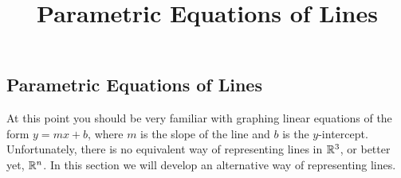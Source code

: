 \documentclass{ximera}
\title{Parametric Equations of Lines} \license{CC BY-NC-SA 4.0}
\begin{document}
\begin{abstract}
  \end{abstract}
\maketitle
\begin{onlineOnly}
\section*{Parametric Equations of Lines}
\end{onlineOnly}

At this point you should be very familiar with graphing linear equations of the form $y=mx+b$, where $m$ is the slope of the line and $b$ is the $y$-intercept.  Unfortunately, there is no equivalent way of representing lines in $\mathbb{R}^3$, or better yet, $\mathbb{R}^n$.  In this section we will develop an alternative way of representing lines.
\end{document}
